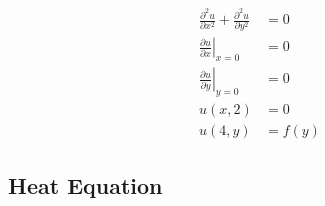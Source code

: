 \documentclass{article}
\begin{document}
\setcounter{subsubsection}{10}
\subsubsection{}

\begin{align*}
  \frac{\partial^2 u}{\partial x^2} + \frac{\partial^2 u}{\partial y^2} & = 0    \\
  \left. \frac{\partial u}{\partial x} \right|_{x = 0}                  & = 0    \\
  \left. \frac{\partial u}{\partial y} \right|_{y = 0}                  & = 0    \\
  u(x, 2)                                                               & = 0    \\
  u(4, y)                                                               & = f(y)
\end{align*}

\subsection{Heat Equation}

\subsubsection{}
\end{document}
